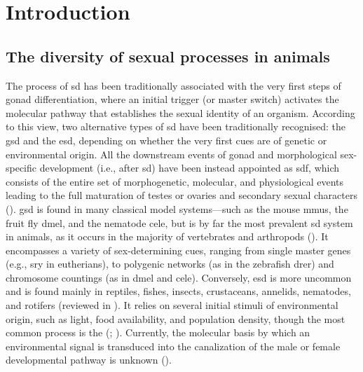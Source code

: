 
% 

{
\chapter{Introduction}

\label{introduction}
}

\section{The diversity of sexual processes in animals}
The process of \gls{sd} has been traditionally associated with the very first steps of gonad differentiation, where an initial trigger (or master switch) activates the molecular pathway that establishes the sexual identity of an organism. According to this view, two alternative types of \gls{sd} have been traditionally recognised: the \gls{gsd} and the \gls{esd}, depending on whether the very first cues are of genetic or environmental origin. All the downstream events of gonad and morphological sex-specific development (i.e., after \gls{sd}) have been instead appointed as \gls{sdf}, which consists of the entire set of morphogenetic, molecular, and physiological events leading to the full maturation of testes or ovaries and secondary sexual characters (). \gls{gsd} is found in many classical model systems---such as the mouse \gls{mmus}, the fruit fly \gls{dmel}, and the nematode \gls{cele}, but is by far the most prevalent \gls{sd} system in animals, as it occurs in the majority of vertebrates and arthropods (). It encompasses a variety of sex-determining cues, ranging from single master genes (e.g., \gls{sry} in eutherians), to polygenic networks (as in the zebrafish \gls{drer}) and chromosome countings (as in \gls{dmel} and \gls{cele}). Conversely, \gls{esd} is more uncommon and is found mainly in reptiles, fishes, insects, crustaceans, annelids, nematodes, and rotifers (reviewed in ). It relies on several initial stimuli of environmental origin, such as light, food availability, and population density, though the most common process is the  (; ). Currently, the molecular basis by which an environmental signal is transduced into the canalization of the male or female developmental pathway is unknown ().

